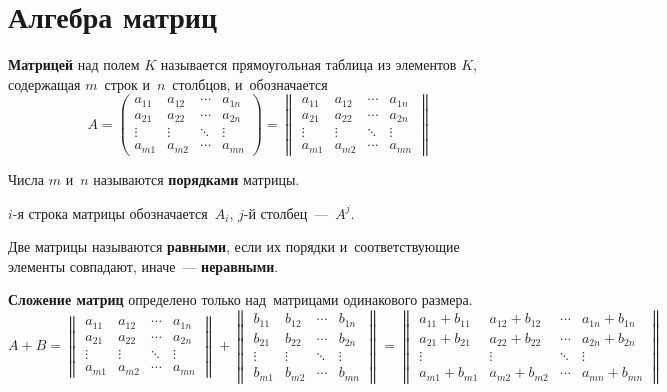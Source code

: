 \section{Алгебра матриц}
\textbf{Матрицей} над полем $K$ называется прямоугольная таблица из элементов $K$, содержащая $m$~строк и~$n$~столбцов, и~обозначается
\begin{equation*}
A =
\begin{pmatrix}
a_{11} & a_{12} & \cdots & a_{1n} \\
a_{21} & a_{22} & \cdots & a_{2n} \\
\vdots & \vdots & \ddots & \vdots \\
a_{m1} & a_{m2} & \cdots & a_{mn}
\end{pmatrix} =
\begin{Vmatrix}
a_{11} & a_{12} & \cdots & a_{1n} \\
a_{21} & a_{22} & \cdots & a_{2n} \\
\vdots & \vdots & \ddots & \vdots \\
a_{m1} & a_{m2} & \cdots & a_{mn}
\end{Vmatrix}
\end{equation*}

Числа $m$ и~$n$ называются \textbf{порядками} матрицы.

$i$\nobreakdash-я строка матрицы обозначается~$A_i$, $j$\nobreakdash-й столбец~---~$A^j$.

Две матрицы называются \textbf{равными}, если их порядки и~соответствующие элементы совпадают, иначе~--- \textbf{неравными}.

\textbf{Сложение матриц} определено только над~матрицами одинакового размера.
$$
A + B =
\begin{Vmatrix}
a_{11} & a_{12} & \cdots & a_{1n} \\ 
a_{21} & a_{22} & \cdots & a_{2n} \\ 
\vdots & \vdots & \ddots & \vdots \\ 
a_{m1} & a_{m2} & \cdots & a_{mn}
\end{Vmatrix} +
\begin{Vmatrix}
b_{11} & b_{12} & \cdots & b_{1n} \\ 
b_{21} & b_{22} & \cdots & b_{2n} \\ 
\vdots & \vdots & \ddots & \vdots \\ 
b_{m1} & b_{m2} & \cdots & b_{mn}
\end{Vmatrix} =
\begin{Vmatrix}
a_{11} + b_{11} & a_{12} + b_{12} & \cdots & a_{1n} + b_{1n} \\ 
a_{21} + b_{21} & a_{22} + b_{22} & \cdots & a_{2n} + b_{2n} \\ 
\vdots & \vdots & \ddots & \vdots \\ 
a_{m1} + b_{m1} & a_{m2} + b_{m2} & \cdots & a_{mn} + b_{mn}
\end{Vmatrix}
$$


